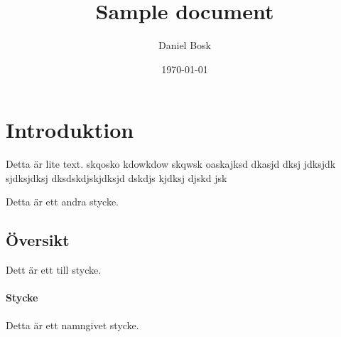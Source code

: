 \documentclass[a4paper]{article}
\author{Daniel Bosk}
\title{Sample document}
\date{\today}
\begin{document}
\maketitle
\tableofcontents

\section{Introduktion}

Detta är lite text. skqosko  kdowkdow skqwsk oaskajksd dkasjd dksj  jdksjdk sjdksjdksj dksdskdjskjdksjd dskdjs kjdksj djskd jsk

Detta är ett andra stycke.

\subsection{Översikt}

Dett är ett till stycke.

\paragraph{Stycke}

Detta är ett namngivet stycke.
\end{document}
